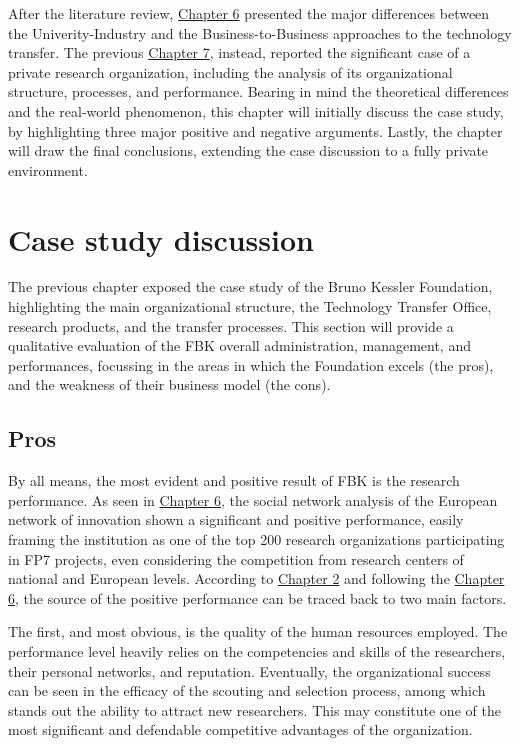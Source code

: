 

\label{Chapter8} %

After the literature review, \hyperref[Chapter6]{Chapter 6} presented the major differences between the Univerity-Industry and the Business-to-Business approaches to the technology transfer. The previous \hyperref[Chapter7]{Chapter 7}, instead, reported the significant case of a private research organization, including the analysis of its organizational structure, processes, and performance. Bearing in mind the theoretical differences and the real-world phenomenon, this chapter will initially discuss the case study, by highlighting three major positive and negative arguments. Lastly, the chapter will draw the final conclusions, extending the case discussion to a fully private environment.

\section{Case study discussion}

The previous chapter exposed the case study of the Bruno Kessler Foundation, highlighting the main organizational structure, the Technology Transfer Office, research products, and the transfer processes. This section will provide a qualitative evaluation of the FBK overall administration, management, and performances, focussing in the areas in which the Foundation excels (the pros), and the weakness of their business model (the cons).

\subsection{Pros}

By all means, the most evident and positive result of FBK is the research performance. As seen in \hyperref[Chapter6]{Chapter 6}, the social network analysis of the European network of innovation shown a significant and positive performance, easily framing the institution as one of the top 200 research organizations participating in FP7 projects, even considering the competition from research centers of national and European levels. According to \hyperref[Chapter2]{Chapter 2} and following the \hyperref[Chapter6]{Chapter 6}, the source of the positive performance can be traced back to two main factors.

The first, and most obvious, is the quality of the human resources employed. The performance level heavily relies on the competencies and skills of the researchers, their personal networks, and reputation. Eventually, the organizational success can be seen in the efficacy of the scouting and selection process, among which stands out the ability to attract new researchers. This may constitute one of the most significant and defendable competitive advantages of the organization. 

